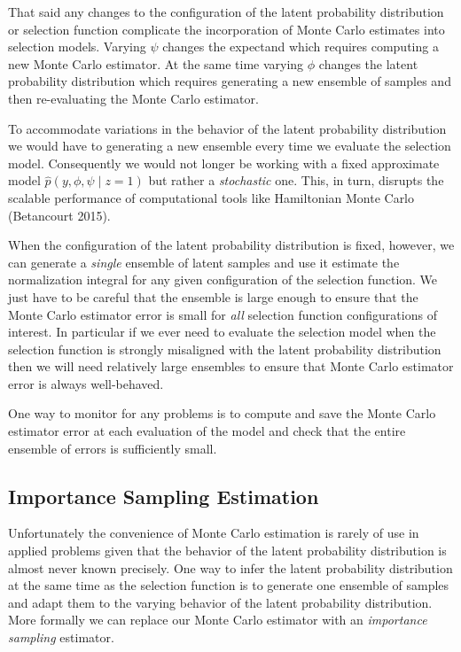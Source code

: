 \documentclass[
  letterpaper,
  DIV=11,
  numbers=noendperiod]{scrartcl}
\begin{document}
That said any changes to the configuration of the latent probability
distribution or selection function complicate the incorporation of Monte
Carlo estimates into selection models. Varying \(\psi\) changes the
expectand which requires computing a new Monte Carlo estimator. At the
same time varying \(\phi\) changes the latent probability distribution
which requires generating a new ensemble of samples and then
re-evaluating the Monte Carlo estimator.

To accommodate variations in the behavior of the latent probability
distribution we would have to generating a new ensemble every time we
evaluate the selection model. Consequently we would not longer be
working with a fixed approximate model
\(\hat{p}(y, \phi, \psi \mid z = 1)\) but rather a \emph{stochastic}
one. This, in turn, disrupts the scalable performance of computational
tools like Hamiltonian Monte Carlo (Betancourt 2015).

When the configuration of the latent probability distribution is fixed,
however, we can generate a \emph{single} ensemble of latent samples and
use it estimate the normalization integral for any given configuration
of the selection function. We just have to be careful that the ensemble
is large enough to ensure that the Monte Carlo estimator error is small
for \emph{all} selection function configurations of interest. In
particular if we ever need to evaluate the selection model when the
selection function is strongly misaligned with the latent probability
distribution then we will need relatively large ensembles to ensure that
Monte Carlo estimator error is always well-behaved.

One way to monitor for any problems is to compute and save the Monte
Carlo estimator error at each evaluation of the model and check that the
entire ensemble of errors is sufficiently small.

\subsection{Importance Sampling
Estimation}\label{importance-sampling-estimation}

Unfortunately the convenience of Monte Carlo estimation is rarely of use
in applied problems given that the behavior of the latent probability
distribution is almost never known precisely. One way to infer the
latent probability distribution at the same time as the selection
function is to generate one ensemble of samples and adapt them to the
varying behavior of the latent probability distribution. More formally
we can replace our Monte Carlo estimator with an \emph{importance
sampling} estimator.
\end{document}
